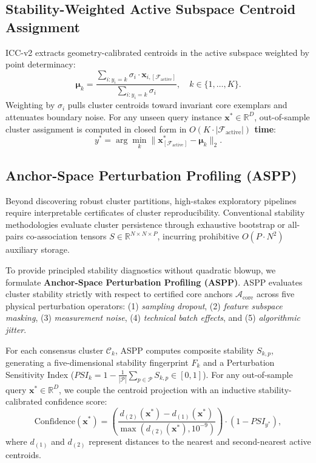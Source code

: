 \documentclass[10pt,conference]{IEEEtran}
\begin{document}
\subsection{Stability-Weighted Active Subspace Centroid Assignment}
ICC-v2 extracts geometry-calibrated centroids in the active subspace weighted by point determinacy:
\begin{equation}
    \boldsymbol{\mu}_k = \frac{\sum_{i: y_i = k} \sigma_i \cdot \mathbf{x}_{i, [\mathcal{F}_{\text{active}}]}}{\sum_{i: y_i = k} \sigma_i}, \quad k \in \{1,\dots,K\}.
\end{equation}
Weighting by $\sigma_i$ pulls cluster centroids toward invariant core exemplars and attenuates boundary noise. For any unseen query instance $\mathbf{x}^* \in \mathbb{R}^D$, out-of-sample cluster assignment is computed in closed form in \textbf{$O(K \cdot |\mathcal{F}_{\text{active}}|)$ time}:
\begin{equation}
    y^* = \arg\min_k \|\mathbf{x}^*_{[\mathcal{F}_{\text{active}}]} - \boldsymbol{\mu}_k\|_2.
\end{equation}

\subsection{Anchor-Space Perturbation Profiling (ASPP)}\label{sec:aspp}
Beyond discovering robust cluster partitions, high-stakes exploratory pipelines require interpretable certificates of cluster reproducibility. Conventional stability methodologies evaluate cluster persistence through exhaustive bootstrap or all-pairs co-association tensors $S \in \mathbb{R}^{N \times N \times P}$, incurring prohibitive $O(P \cdot N^2)$ auxiliary storage.

To provide principled stability diagnostics without quadratic blowup, we formulate \textbf{Anchor-Space Perturbation Profiling (ASPP)}. ASPP evaluates cluster stability strictly with respect to certified core anchors $\mathcal{A}_{\text{core}}$ across five physical perturbation operators: (1) \textit{sampling dropout}, (2) \textit{feature subspace masking}, (3) \textit{measurement noise}, (4) \textit{technical batch effects}, and (5) \textit{algorithmic jitter}.

For each consensus cluster $\mathcal{C}_k$, ASPP computes composite stability $S_{k, p}$, generating a five-dimensional stability fingerprint $F_k$ and a Perturbation Sensitivity Index ($PSI_k = 1 - \frac{1}{|\mathcal{P}|}\sum_{p \in \mathcal{P}} S_{k, p} \in [0, 1]$). For any out-of-sample query $\mathbf{x}^* \in \mathbb{R}^D$, we couple the centroid projection with an inductive stability-calibrated confidence score:
\begin{equation}
    \text{Confidence}(\mathbf{x}^*) = \left(\frac{d_{(2)}(\mathbf{x}^*) - d_{(1)}(\mathbf{x}^*)}{\max(d_{(2)}(\mathbf{x}^*), 10^{-9})}\right) \cdot (1 - PSI_{y^*}),
\end{equation}
where $d_{(1)}$ and $d_{(2)}$ represent distances to the nearest and second-nearest active centroids.
\end{document}
